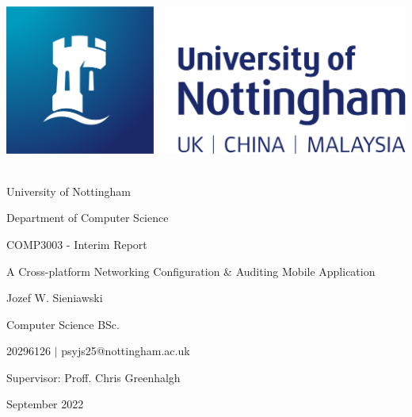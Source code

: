 \documentclass [12pt,letterpaper]{article}
\begin{document}
 
\thispagestyle{empty}
\begin{center}
    \centering
    \includegraphics[width=0.3\linewidth]{images/nottingham-logo.png}
    \vspace{0.1cm}
    {\Large \\University of Nottingham\par}
    {\Large Department of Computer Science\par}
    \vspace{3cm}
    {\Large COMP3003 - Interim Report\par}
    \vspace{0.5cm}
    {\Large A Cross-platform Networking Configuration \& Auditing Mobile Application\par}
    \vspace{2.5cm}
    {\Large Jozef W. Sieniawski\par}
    {\small Computer Science BSc. \par}
    {\small 20296126 $|$ psyjs25@nottingham.ac.uk\par}
    \vspace{1cm}
    {\normalsize Supervisor: Proff. Chris Greenhalgh\par}
    \vspace{3cm}
    {\Large September 2022}
\end{center}

\pagebreak
\begin{abstract}
For Small/Medium, and even some large, companies that own and maintain their own server spaces, a unique set of challenges are to be faced. Although these devices are typically business critical, they are typically squeezed into encumbered spaces, with lackluster lighting and limited access. Further, and critically, this makes the maintaining and documenting of these devices inherently more difficuly. Current alternative solutions fail to focus on insitu use, and are typically bloated with features for large data centers. This project investigates the needs and requirements that can solves these challenges, with a focus on Human-Computer Interaction. From these designs, this project then implements a cross-platform mobile application that satisfies these needs.
\end{abstract}
\pagebreak
\tableofcontents
\pagebreak 
\end{document}

